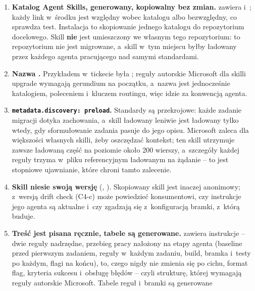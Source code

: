 \begin{enumerate}
  \item \textbf{Katalog Agent Skills, generowany, kopiowalny bez zmian.}
         zawiera 
        i~; każdy link w~środku jest względny wobec katalogu albo
        bezwzględny, co sprawdza test. Instalacja to skopiowanie jednego katalogu do
         repozytorium docelowego. Skill \textbf{nie} jest umieszczony we
        własnym  tego repozytorium: to repozytorium nie jest migrowane,
        a~skill w~tym miejscu byłby ładowany przez każdego agenta pracującego nad samymi
        standardami.
  \item \textbf{Nazwa .} Przykładem w~tickecie
        była ; reguły autorskie Microsoft dla skilli
        upgrade wymagają gerundium na początku, a~nazwa jest jednocześnie katalogiem,
        poleceniem  i~kluczem routingu, więc idzie za konwencją agenta.
  \item \textbf{\texttt{metadata.discovery: preload}.} Standardy są przekrojowe: każde
        zadanie migracji dotyka zachowania, a~skill ładowany leniwie jest ładowany tylko
        wtedy, gdy sformułowanie zadania pasuje do jego opisu. Microsoft zaleca
         dla większości własnych skilli, żeby oszczędzać kontekst; ten skill
        utrzymuje zawsze ładowaną część na poziomie około 200 wierszy, a~szczegóły każdej
        reguły trzyma w~pliku referencyjnym ładowanym na żądanie -- to jest stopniowe
        ujawnianie, które chroni tamto zalecenie.
  \item \textbf{Skill niesie swoją wersję} (,
        ). Skopiowany skill jest inaczej anonimowy; z~wersją drift
        check (C4-c) może powiedzieć konsumentowi, czy instrukcje jego agenta są aktualne
        i~czy zgadzają się z~konfiguracją bramki, z~którą buduje.
  \item \textbf{Treść jest pisana ręcznie, tabele są generowane.}
         zawiera instrukcje -- dwie reguły nadrzędne, przebieg
        pracy nałożony na etapy agenta (baseline przed pierwszym zadaniem, reguły w~każdym
        zadaniu, build, bramka i~testy po każdym, flagi na końcu), to, czego nigdy nie zmienia
        się po cichu, format flag, kryteria sukcesu i~obsługę błędów -- czyli strukturę,
        której wymagają reguły autorskie Microsoft. Tabele reguł i~bramki są generowane

\end{enumerate}
